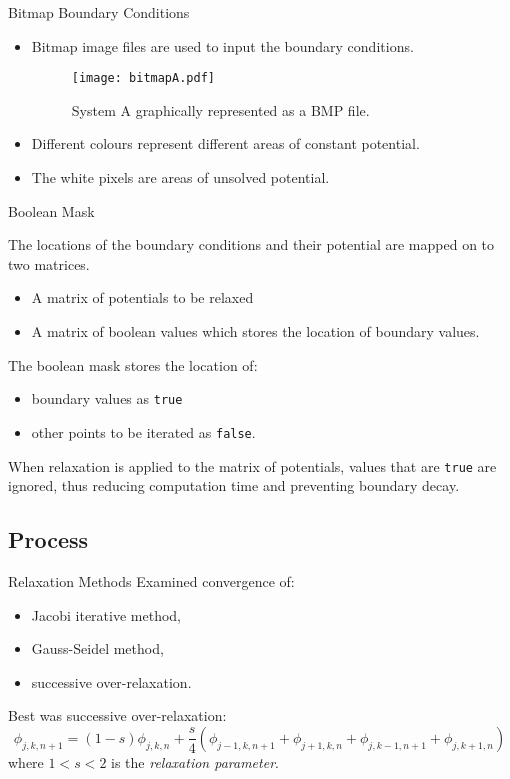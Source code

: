 \documentclass{beamer}
\newcommand{\be}{\begin{equation}}
\newcommand{\ee}{\end{equation}}
\begin{document}
\begin{frame}{Bitmap Boundary Conditions}

\begin{itemize}
\item Bitmap image files are used to input the boundary conditions.

\begin{figure}[H]
\centering
\texttt{[image: bitmapA.pdf]}
\caption{System A graphically represented as a BMP file.}
\end{figure}

\item Different colours represent different areas of constant potential.
\item The white pixels are areas of unsolved potential.

\end{itemize}

\end{frame}

\begin{frame}{Boolean Mask}

The locations of the boundary conditions and their potential are mapped on to two matrices.

\begin{itemize}
\item A matrix of potentials to be relaxed
\item A matrix of boolean values which stores the location of boundary values.
\end{itemize}

The boolean mask stores the location of:
\begin{itemize} 
\item boundary values as \lstinline|true|
\item other points to be iterated as \lstinline|false|.
\end{itemize}
When relaxation is applied to the matrix of potentials, values that are \lstinline|true|
are ignored, thus reducing computation time and preventing boundary decay.

\end{frame}

\subsection{Process}

\begin{frame}{Relaxation Methods}
Examined convergence of: 
\begin{itemize}
\item Jacobi iterative method,
\item Gauss-Seidel method,
\item successive over-relaxation.
\end{itemize}

Best was successive over-relaxation:
%
\be
\phi_{j,k,n+1}= (1-s)\phi_{j,k,n}+\frac{s}{4}(\phi_{j-1,k,n+1}+\phi_{j+1,k,n}+\phi_{j,k-1,n+1}+\phi_{j,k+1,n})
\ee
%
where $1<s<2$ is the \emph{relaxation parameter}.

\end{frame}
\end{document}
